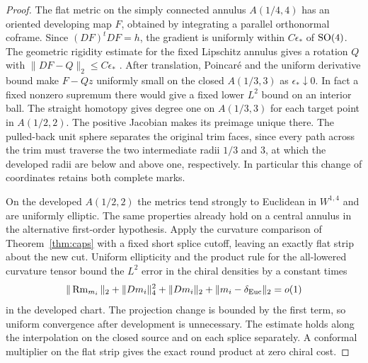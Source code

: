 \begin{proof}
The flat metric on the simply connected annulus \(A(1/4,4)\)
has an oriented developing map \(F\), obtained by integrating a
parallel orthonormal coframe. Since \((DF)^tDF=h\), the gradient
is uniformly within \(C\epsilon_*\) of \(\operatorname{SO}(4)\). The geometric
rigidity estimate for the fixed Lipschitz annulus gives a
rotation \(Q\) with \(\|DF-Q\|_2\le C\epsilon_*\)
\cite[Theorem 3.1]{FrieseckeJamesMueller2002Rigidity}.
After translation, Poincar\'e and the uniform derivative bound
make \(F-Qz\) uniformly small on the closed \(A(1/3,3)\) as
\(\epsilon_*\downarrow0\). In fact a fixed nonzero supremum
there would give a fixed lower \(L^2\) bound on an interior ball.
The straight homotopy gives degree one on \(A(1/3,3)\) for
each target point in \(A(1/2,2)\). The positive Jacobian makes
its preimage unique there. The pulled-back unit sphere separates
the original trim faces, since every path across the trim must
traverse the two intermediate radii \(1/3\) and \(3\), at which
the developed radii are below and above one, respectively. In
particular this change of coordinates retains both complete marks.

On the developed \(A(1/2,2)\) the metrics tend strongly to
Euclidean in \(W^{1,4}\) and are uniformly elliptic. The same
properties already hold on a central annulus in the alternative
first-order hypothesis. Apply the curvature comparison of
Theorem~\ref{thm:caps} with a fixed short splice cutoff, leaving
an exactly flat strip about the new cut. Uniform ellipticity and
the product rule for the all-lowered curvature tensor bound the
\(L^2\) error in the chiral densities by a constant times
\[
 \|\operatorname{Rm}_{m_i}\|_2+\|Dm_i\|_4^2+\|Dm_i\|_2+
 \|m_i-\delta_{\rm Euc}\|_2=o(1)
\]
in the developed chart. The projection change is bounded by the
first term, so uniform convergence after development is unnecessary.
The estimate holds along the interpolation on the closed source
and on each splice separately. A conformal multiplier on the
flat strip gives the exact round product at zero chiral cost.


\end{proof}
